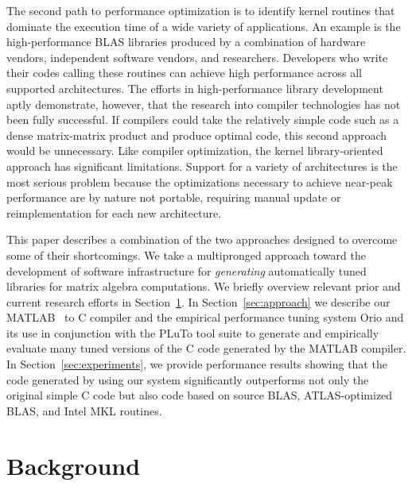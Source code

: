 \documentclass[runningheads]{llncs}
\begin{document}
The second path to performance optimization is to identify kernel
routines that dominate the execution time of a wide variety of
applications.  
An example is the high-performance BLAS libraries produced by a combination
of hardware vendors, independent software vendors, and researchers.
Developers who write their codes calling these routines can achieve high
performance across all supported architectures. The efforts in
high-performance library development aptly demonstrate, however, that the
research into compiler technologies has not been fully successful.  If
compilers could take the relatively simple code such as a dense matrix-matrix
product and produce optimal code, this second approach would be unnecessary.
Like compiler optimization, the kernel library-oriented approach has
significant limitations.  Support for a variety of architectures is the most
serious problem because the optimizations necessary to achieve near-peak
performance are by nature not portable, requiring manual update or
reimplementation for each new architecture.

This paper describes a combination of the two approaches designed to overcome
some of their shortcomings. We take a multipronged approach
toward the development of software infrastructure for \emph{generating}
automatically tuned libraries for matrix algebra computations.  We briefly
overview relevant prior and current research efforts in
Section~\ref{sec:background}. In Section~\ref{sec:approach} we describe our
MATLAB~\cite{matlab:webpage} to C compiler and the empirical performance tuning system Orio and its
use in conjunction with the PLuTo tool suite to generate and empirically
evaluate many tuned versions of the C code generated by the MATLAB compiler.
In Section~\ref{sec:experiments}, we provide performance results showing that
the code generated by using our system significantly outperforms not only the
original simple C code but also code based on source BLAS, ATLAS-optimized
BLAS, and Intel MKL routines.

\section{Background}
\label{sec:background}
\end{document}
